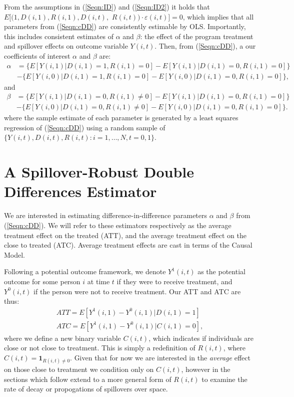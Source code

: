 From the assumptions in (\ref{Seqn:ID}) and (\ref{Seqn:ID2}) it holds that 
$E[(1,D(i,1),R(i,1),D(i,t),$
$R(i,t))\cdot\varepsilon(i,t)]=0$, which 
implies that all parameters from (\ref{Seqn:cDD}) are consistently estimable 
by OLS.  Importantly, this includes consistent estimates of $\alpha$ and 
$\beta$: the effect of the program treatment and spillover effects on 
outcome variable $Y(i,t)$.  Then, from (\ref{Seqn:cDD}), a our coefficients 
of interest $\alpha$ and $\beta$ are:
\begin{equation}
\nonumber
\label{Seqn:DDa}
\begin{split}
\alpha&=\{E[Y(i,1)|D(i,1)=1,R(i,1)=0]-E[Y(i,1)|D(i,1)=0,R(i,1)=0]\} \\
      &-\{E[Y(i,0)|D(i,1)=1,R(i,1)=0]-E[Y(i,0)|D(i,1)=0,R(i,1)=0]\}, 
\end{split}
\end{equation}
and 
\begin{equation}
\nonumber
\label{Seqn:DDb}
\begin{split}
\beta&=\{E[Y(i,1)|D(i,1)=0,R(i,1)\neq 0]-E[Y(i,1)|D(i,1)=0,R(i,1)=0]\} \\
      &-\{E[Y(i,0)|D(i,1)=0,R(i,1)\neq 0]-E[Y(i,0)|D(i,1)=0,R(i,1)=0]\}. 
\end{split}
\end{equation}
where the sample estimate of each parameter is generated by a least squares
regression of (\ref{Seqn:cDD}) using a random sample of 
$\{Y(i,t), D(i,t), R(i,t): i=1, \ldots, N, t=0, 1\}$.

\section{A Spillover-Robust Double Differences Estimator}
\label{Sscn:estim}
We are interested in estimating difference-in-difference parameters $\alpha$ and 
$\beta$ from (\ref{Seqn:cDD}).  We will refer to these estimators respectively
as the average treatment effect on the treated (ATT), and the average treatment
effect on the close to treated (ATC).  Average treatment effects are cast in 
terms of the \citet{Rubin1974} Causal Model.

Following a potential outcome framework, we denote $Y^1(i,t)$ as the potential
outcome for some person $i$ at time $t$ if they were to receive treatment, and
$Y^0(i,t)$ if the person were not to receive treatment.  Our ATT and ATC are
thus:
\begin{eqnarray}
\label{Seqn:estimATT}
ATT=E[Y^1(i,1)-Y^0(i,1)|D(i,1)=1]\  \\
\label{Seqn:estimATC}
ATC=E[Y^1(i,1)-Y^0(i,1)|C(i,1)= 0],
\end{eqnarray}
where we define a new binary variable $C(i,t)$, which indicates if individuals 
are close or not close to treatment.  This is simply a redefinition of $R(i,t)$,
where $C(i,t)=\mathbf{1}_{R(i,t)\neq 0}$.  Given that for now we are interested
in the \emph{average} effect on those close to treatment we condition only on
$C(i,t)$, however in the sections which follow extend to a more general form of
$R(i,t)$ to examine the rate of decay or propogations of spillovers over space.


